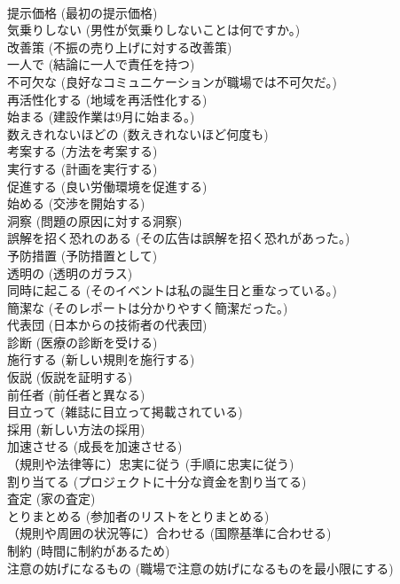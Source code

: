 \documentclass[8pt]{extreport}
\begin{document}
\begin{CJK}{UTF8}{min}
\\	提示価格	(最初の提示価格)		
\\	気乗りしない	(男性が気乗りしないことは何ですか。)		
\\	改善策	(不振の売り上げに対する改善策)		
\\	一人で	(結論に一人で責任を持つ)		
\\	不可欠な	(良好なコミュニケーションが職場では不可欠だ。)		
\\	再活性化する	(地域を再活性化する)		
\\	始まる	(建設作業は9月に始まる。)		
\\	数えきれないほどの	(数えきれないほど何度も)		
\\	考案する	(方法を考案する)		
\\	実行する	(計画を実行する)		
\\	促進する	(良い労働環境を促進する)		
\\	始める	(交渉を開始する)		
\\	洞察	(問題の原因に対する洞察)		
\\	誤解を招く恐れのある	(その広告は誤解を招く恐れがあった。)		
\\	予防措置	(予防措置として)		
\\	透明の	(透明のガラス)		
\\	同時に起こる	(そのイベントは私の誕生日と重なっている。)		
\\	簡潔な	(そのレポートは分かりやすく簡潔だった。)		
\\	代表団	(日本からの技術者の代表団)		
\\	診断	(医療の診断を受ける)		
\\	施行する	(新しい規則を施行する)		
\\	仮説	(仮説を証明する)		
\\	前任者	(前任者と異なる)		
\\	目立って	(雑誌に目立って掲載されている)		
\\	採用	(新しい方法の採用)		
\\	加速させる	(成長を加速させる)		
\\	（規則や法律等に）忠実に従う	(手順に忠実に従う)		
\\	割り当てる	(プロジェクトに十分な資金を割り当てる)		
\\	査定	(家の査定)		
\\	とりまとめる	(参加者のリストをとりまとめる)		
\\	（規則や周囲の状況等に）合わせる	(国際基準に合わせる)		
\\	制約	(時間に制約があるため)		
\\	注意の妨げになるもの	(職場で注意の妨げになるものを最小限にする)		

\end{CJK}
\end{document}
